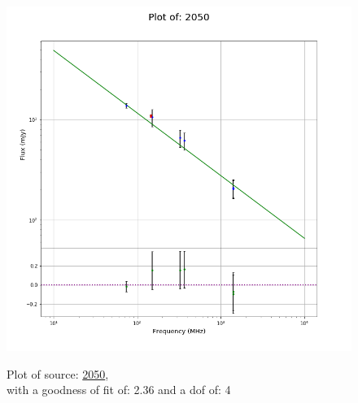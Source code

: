 \documentclass{article}
\begin{document}
\begin{figure}[H]
\begin{minipage}{0.5\textwidth}
        \includegraphics[scale = 0.35]{KmeulenTrap4P23_1hr/1hr2050.png}
        \captionsetup{labelformat=empty}
        \caption{Plot of source: \href{http://banana.transientskp.org/r4/vlo_KmeulenTrap4P23/runningcatalog/2050}{2050},\\with a goodness of fit of: 2.36 and a dof of: 4}
    \addtocounter{figure}{-1}
    \label{KmeulenTrap4P23:1hr:2050:plot}
    \end{minipage}
\end{figure}
\end{document}
